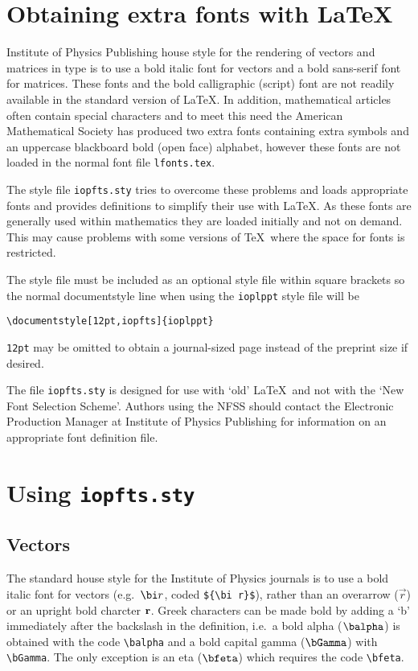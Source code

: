 \begin{abstract}
This paper describes the use of the optional style file \verb"iopfts.sty"
to enable appropriate fonts for vectors, matrices, bold calligraphic and
the AMS extension fonts to be used with the IOP journal preprint style.
\end{abstract}

\section{Obtaining extra fonts with \LaTeX}
Institute of Physics Publishing house
style for the rendering of vectors and matrices 
in type is to use a bold italic font for vectors and a bold sans-serif
font for matrices. These fonts and the bold calligraphic (script) font
are not readily available in the standard version of \LaTeX.
In addition, mathematical articles often contain special 
characters 
and to meet this need 
the American Mathematical Society
has produced two extra fonts containing extra symbols and an uppercase 
blackboard bold (open face) alphabet, however these fonts
are not loaded in the normal font file
\verb"lfonts.tex".

The style file \verb"iopfts.sty" tries to overcome these problems
and loads appropriate fonts and provides definitions to simplify their use
with \LaTeX. As these fonts are generally used within
mathematics they are loaded initially and not on demand. This may cause
problems with some versions of \TeX\ where the space for fonts is
restricted.

The style file must be included as an optional style file within square
brackets so the normal documentstyle line when using the
\verb"ioplppt" style file will be
\begin{verbatim}
\documentstyle[12pt,iopfts]{ioplppt}
\end{verbatim}
\verb"12pt" may be omitted to obtain a journal-sized page instead of the 
preprint size if desired.

The file \verb"iopfts.sty" is designed for use with `old' \LaTeX\ and not
with the `New Font Selection Scheme'. Authors using the NFSS should contact
the Electronic Production Manager at Institute of Physics Publishing 
for information on an appropriate 
font definition file.

\section{Using \protect\verb"iopfts.sty"}
\subsection{Vectors}
The standard house style for the Institute of Physics journals is to use a
bold italic font for vectors (e.g.\ ${\bi r}$, coded \verb"${\bi r}$"), 
rather than an overarrow ($\vec r$) or an upright bold charcter $\bf r$.
Greek characters can
be made bold by adding a `b' immediately after the backslash in the
definition, i.e.\ a bold alpha ($\balpha$) is obtained with the code
\verb"\balpha" and a bold capital gamma ($\bGamma$) with \verb"\bGamma".
The only exception is an eta ($\bfeta$) which requires the code
\verb"\bfeta".

